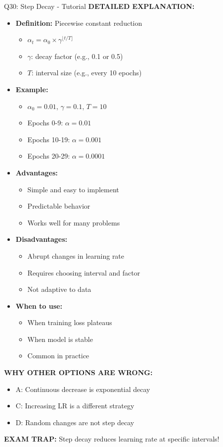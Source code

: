 \documentclass[8pt]{beamer}
\begin{document}
\begin{frame}{Q30: Step Decay - Tutorial}
		\vspace{0.05cm}
		\textbf{DETAILED EXPLANATION:}
		\begin{itemize}
			\item \textbf{Definition:} Piecewise constant reduction
			\begin{itemize}
				\item $\alpha_t = \alpha_0 \times \gamma^{\lfloor t/T \rfloor}$
				\item $\gamma$: decay factor (e.g., 0.1 or 0.5)
				\item $T$: interval size (e.g., every 10 epochs)
			\end{itemize}
			\item \textbf{Example:}
			\begin{itemize}
				\item $\alpha_0 = 0.01$, $\gamma = 0.1$, $T = 10$
				\item Epochs 0-9: $\alpha = 0.01$
				\item Epochs 10-19: $\alpha = 0.001$
				\item Epochs 20-29: $\alpha = 0.0001$
			\end{itemize}
			\item \textbf{Advantages:}
			\begin{itemize}
				\item Simple and easy to implement
				\item Predictable behavior
				\item Works well for many problems
			\end{itemize}
			\item \textbf{Disadvantages:}
			\begin{itemize}
				\item Abrupt changes in learning rate
				\item Requires choosing interval and factor
				\item Not adaptive to data
			\end{itemize}
			\item \textbf{When to use:}
			\begin{itemize}
				\item When training loss plateaus
				\item When model is stable
				\item Common in practice
			\end{itemize}
		\end{itemize}
		
		\vspace{0.05cm}
		\textcolor{myred}{\textbf{WHY OTHER OPTIONS ARE WRONG:}}
		\begin{itemize}
			\item \textcolor{myred}{A:} Continuous decrease is exponential decay
			\item \textcolor{myred}{C:} Increasing LR is a different strategy
			\item \textcolor{myred}{D:} Random changes are not step decay
		\end{itemize}
		
		\textcolor{myred}{\textbf{EXAM TRAP:}} Step decay reduces learning rate \textcolor{myblue}{at specific intervals}!
	\end{frame}
	
\end{document}
